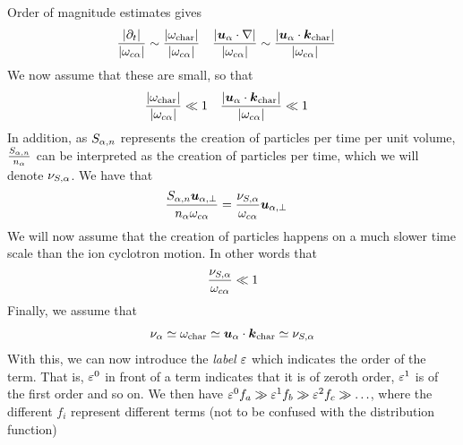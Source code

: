 %
Order of magnitude estimates gives
%
\begin{align*}
 &\frac{\L|\partial_t\R|}{\L|\om_{c\a}\R|}  \sim
 \frac{\L|\om_{\text{char}}\R|}{\L|\om_{c\a}\R|}&
%
 &\frac{\L|\ve{u}_{\a}\cdot\nabla\R|}{\L|\om_{c\a}\R|} \sim
 \frac{\L|\ve{u}_{\a}\cdot\ve{k}_{\text{char}}\R|}{\L|\om_{c\a}\R|}
\end{align*}
%
We now assume that these are small, so that
%
\begin{align*}
 &\frac{\L|\om_{\text{char}}\R|}{\L|\om_{c\a}\R|} \ll 1&
%
 &\frac{\L|\ve{u}_{\a}\cdot\ve{k}_{\text{char}}\R|}{\L|\om_{c\a}\R|} \ll 1
\end{align*}
%
In addition, as $S_{\alpha,n}$ represents the creation of particles per time per unit volume, $\frac{S_{\alpha,n}}{n_\alpha}$ can be interpreted as the creation of particles per time, which we will denote $\nu_{S,\alpha}$.
We have that
%
\begin{align*}
 \frac{
     S_{\alpha,n}\boldsymbol{u}_{\alpha,\perp}
 }{n_\alpha \omega_{c\alpha}}
 &=
 \frac{
     \nu_{S,\alpha}
 }{ \omega_{c\alpha}}
\boldsymbol{u}_{\alpha,\perp}
\end{align*}
%
We will now assume that the creation of particles happens on a much slower time scale than the ion cyclotron motion.
In other words that
%
\begin{align*}
 \frac{
     \nu_{S,\alpha}
 }{ \omega_{c\alpha}}
 \ll
 1
\end{align*}
%
Finally, we assume that
%
\begin{align*}
 \nu_\alpha \simeq
 \omega_{\text{char}} \simeq
 \boldsymbol{u}_{\alpha}\cdot\boldsymbol{k}_{\text{char}}\simeq
 \nu_{S,\alpha}
\end{align*}
%
With this, we can now introduce the \emph{label} $\varepsilon$ which indicates the order of the term.
That is, $\varepsilon^0$ in front of a term indicates that it is of zeroth order, $\varepsilon^1$ is of the first order and so on.
We then have $\varepsilon^0 f_a \gg \varepsilon^1 f_b \gg \varepsilon^2 f_c \gg \ldots$, where the different $f_i$ represent different terms (not to be confused with the distribution function)

